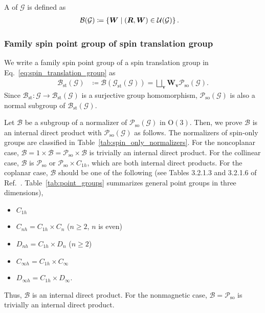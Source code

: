 A  of $\mathcal{G}$ is defined as
\begin{align}
  \mathcal{B}(\mathcal{G})
    &\coloneqq \left\{  \bm{W}  \mathrel{}\middle|\mathrel{}  (\bm{R}, \bm{W}) \in \mathcal{U}(\mathcal{G})  \right\}.
\end{align}

\subsubsection{Family spin point group of spin translation group}

We write a family spin point group of a spin translation group in Eq.~\eqref{eq:spin_translation_group} as
\begin{align}
    \mathcal{B}_{\mathrm{st}}(\mathcal{G})
        &\coloneqq \mathcal{B}(\mathcal{G}_{\mathrm{st}}(\mathcal{G}))
        = \bigsqcup_{ \bm{v} } \bm{W}_{\bm{v}} \mathcal{P}_{\mathrm{so}}(\mathcal{G}).
\end{align}
Since $\mathcal{B}_{\mathrm{st}}: \mathcal{G} \to \mathcal{B}_{\mathrm{st}}(\mathcal{G})$ is a surjective group homomorphism, $\mathcal{P}_{\mathrm{so}}(\mathcal{G})$ is also a normal subgroup of $\mathcal{B}_{\mathrm{st}}(\mathcal{G})$.

Let $\mathcal{B}$ be a subgroup of a normalizer of $\mathcal{P}_{\mathrm{so}}(\mathcal{G})$ in $\mathrm{O}(3)$.
Then, we prove $\mathcal{B}$ is an internal direct product with $\mathcal{P}_{\mathrm{so}}(\mathcal{G})$ as follows.
The normalizers of spin-only groups are classified in Table~\ref{tab:spin_only_normalizers}.
For the noncoplanar case, $\mathcal{B} = 1 \times \mathcal{B} = \mathcal{P}_{\mathrm{so}} \times \mathcal{B}$ is trivially an internal direct product.
For the collinear case, $\mathcal{B}$ is $\mathcal{P}_{\mathrm{so}}$ or $\mathcal{P}_{\mathrm{so}} \times C_{1h}$, which are both internal direct products.
For the coplanar case, $\mathcal{B}$ should be one of the following (see Tables 3.2.1.3 and 3.2.1.6 of Ref.~\cite{hahn2016point}. Table~\ref{tab:point_groups} summarizes general point groups in three dimensions),
\begin{itemize}
  \item $C_{1h}$
  \item $C_{nh} = C_{1h} \times C_{n}$ ($n \geq 2$, $n$ is even)
  \item $D_{nh} = C_{1h} \times D_{n}$ ($n \geq 2$)
  \item $C_{\infty h} = C_{1h} \times C_{\infty}$
  \item $D_{\infty h} = C_{1h} \times D_{\infty}$.
\end{itemize}
Thus, $\mathcal{B}$ is an internal direct product.
For the nonmagnetic case, $\mathcal{B} = \mathcal{P}_{\mathrm{so}}$ is trivially an internal direct product.

